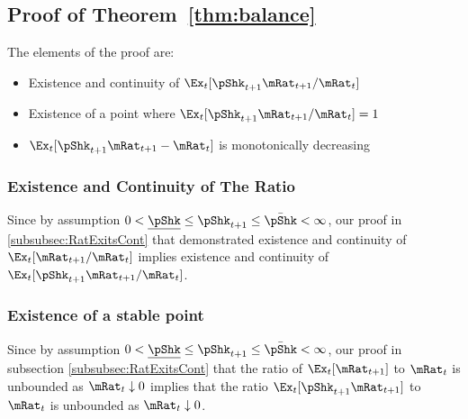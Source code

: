 \documentclass[\econtexRoot/BufferStockTheory]{subfiles}
\begin{document}
  
\subsection{Proof of Theorem~\ref{thm:balance}}

The elements of the proof are:
\begin{itemize}
\item Existence and continuity of $\Ex_{t}[\pShk_{t+1}\mRat_{t+1}/\mRat_t]$
\item Existence of a point where $\Ex_{t}[\pShk_{t+1}\mRat_{t+1}/\mRat_t] = 1$
\item $\Ex_{t}[\pShk_{t+1}\mRat_{t+1}-\mRat_{t}]$ is monotonically decreasing
\end{itemize}

\subsubsection{Existence and Continuity of The Ratio}%

Since by assumption $ 0 < \underline{\pShk} \leq \pShk_{t+1} \leq \bar{\pShk} < \infty$, our proof in \ref{subsubsec:RatExitsCont} that demonstrated existence and continuity of $\Ex_{t}[\mRat_{t+1}/\mRat_{t}]$ implies existence and continuity of $\Ex_{t}[\pShk_{t+1}\mRat_{t+1}/\mRat_{t}]$.

\subsubsection{Existence of a stable point}

Since by assumption $ 0 < \underline{\pShk} \leq \pShk_{t+1} \leq \bar{\pShk} < \infty$, our proof in subsection \ref{subsubsec:RatExitsCont} that the ratio of $\Ex_{t}[\mRat_{t+1}]$ to $\mRat_{t}$ is unbounded as $\mRat_{t} \downarrow 0$ implies that the ratio $\Ex_{t}[\pShk_{t+1}\mRat_{t+1}]$ to $\mRat_{t}$ is unbounded as $\mRat_{t} \downarrow 0$.
\end{document}
